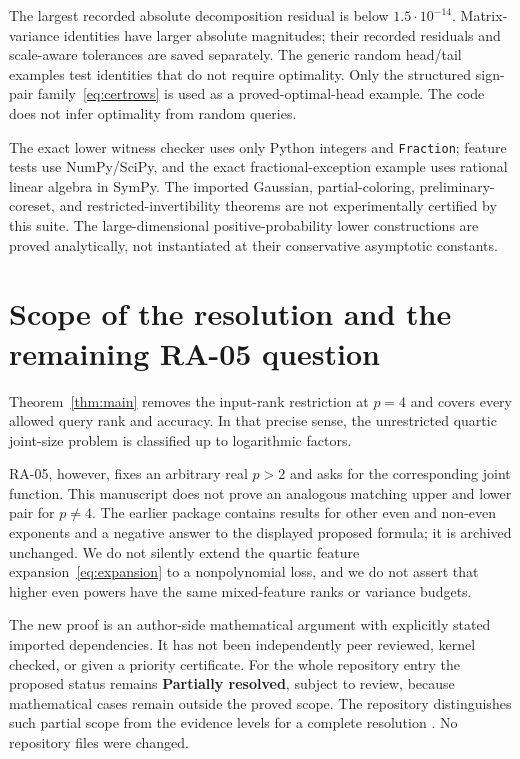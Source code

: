 \documentclass[11pt]{article}
\theoremstyle{remark}\newtheorem{remark}[theorem]{Remark}
\numberwithin{equation}{section}
\begin{document}
The largest recorded absolute decomposition residual is below $1.5\cdot10^{-14}$. Matrix-variance identities have larger absolute magnitudes; their recorded residuals and scale-aware tolerances are saved separately. The generic random head/tail examples test identities that do not require optimality. Only the structured sign-pair family~\eqref{eq:certrows} is used as a proved-optimal-head example. The code does not infer optimality from random queries.

The exact lower witness checker uses only Python integers and \texttt{Fraction}; feature tests use NumPy/SciPy, and the exact fractional-exception example uses rational linear algebra in SymPy. The imported Gaussian, partial-coloring, preliminary-coreset, and restricted-invertibility theorems are not experimentally certified by this suite. The large-dimensional positive-probability lower constructions are proved analytically, not instantiated at their conservative asymptotic constants.

\section{Scope of the resolution and the remaining RA-05 question}\label{sec:scope}
Theorem~\ref{thm:main} removes the input-rank restriction at $p=4$ and covers every allowed query rank and accuracy. In that precise sense, the unrestricted quartic joint-size problem is classified up to logarithmic factors.

RA-05, however, fixes an arbitrary real $p>2$ and asks for the corresponding joint function. This manuscript does not prove an analogous matching upper and lower pair for $p\ne4$. The earlier package contains results for other even and non-even exponents and a negative answer to the displayed proposed formula; it is archived unchanged. We do not silently extend the quartic feature expansion~\eqref{eq:expansion} to a nonpolynomial loss, and we do not assert that higher even powers have the same mixed-feature ranks or variance budgets.

The new proof is an author-side mathematical argument with explicitly stated imported dependencies. It has not been independently peer reviewed, kernel checked, or given a priority certificate. For the whole repository entry the proposed status remains \textbf{Partially resolved}, subject to review, because mathematical cases remain outside the proved scope. The repository distinguishes such partial scope from the evidence levels for a complete resolution \cite{status}. No repository files were changed.
\end{document}
